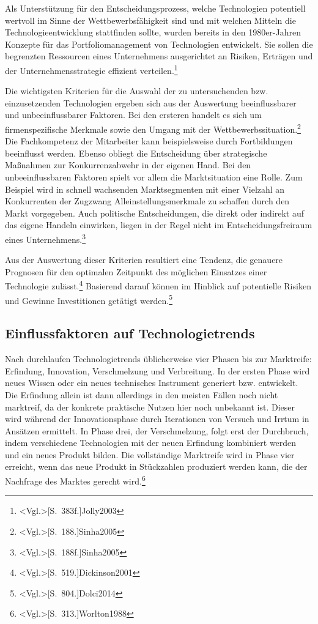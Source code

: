 Als Unterstützung für den Entscheidungsprozess, welche Technologien potentiell wertvoll im Sinne der Wettbewerbsfähigkeit sind und mit welchen Mitteln die Technologieentwicklung stattfinden sollte, wurden bereits in den 1980er-Jahren Konzepte für das Portfoliomanagement von Technologien entwickelt. Sie sollen die begrenzten Ressourcen eines Unternehmens ausgerichtet an Risiken, Erträgen und der Unternehmensstrategie effizient verteilen.\footnote{\citeNP<Vgl.>[S.~383f.]{Jolly2003}}

Die wichtigsten Kriterien für die Auswahl der zu untersuchenden bzw. einzusetzenden Technologien ergeben sich aus der Auswertung beeinflussbarer und unbeeinflussbarer Faktoren. Bei den ersteren handelt es sich um firmenspezifische Merkmale sowie den Umgang mit der Wettbewerbssituation.\footnote{\citeNP<Vgl.>[S.~188.]{Sinha2005}} Die Fachkompetenz der Mitarbeiter kann beispielsweise durch Fortbildungen beeinflusst werden. Ebenso obliegt die Entscheidung über strategische Maßnahmen zur Konkurrenzabwehr in der eigenen Hand. Bei den unbeeinflussbaren Faktoren spielt vor allem die Marktsituation eine Rolle. Zum Beispiel wird in schnell wachsenden Marktsegmenten mit einer Vielzahl an Konkurrenten der Zugzwang Alleinstellungsmerkmale zu schaffen durch den Markt vorgegeben. Auch politische Entscheidungen, die direkt oder indirekt auf das eigene Handeln einwirken, liegen in der Regel nicht im Entscheidungsfreiraum eines Unternehmens.\footnote{\citeNP<Vgl.>[S.~188f.]{Sinha2005}}

Aus der Auswertung dieser Kriterien resultiert eine Tendenz, die genauere Prognosen für den optimalen Zeitpunkt des möglichen Einsatzes einer Technologie zulässt.\footnote{\citeNP<Vgl.>[S.~519.]{Dickinson2001}} Basierend darauf können im Hinblick auf potentielle Risiken und Gewinne Investitionen getätigt werden.\footnote{\citeNP<Vgl.>[S.~804.]{Dolci2014}}

\subsection{Einflussfaktoren auf Technologietrends}
Nach  durchlaufen Technologietrends üblicherweise vier Phasen bis zur Marktreife: Erfindung, Innovation, Verschmelzung und Verbreitung. In der ersten Phase wird neues Wissen oder ein neues technisches Instrument generiert bzw. entwickelt. Die Erfindung allein ist dann allerdings in den meisten Fällen noch nicht marktreif, da der konkrete praktische Nutzen hier noch unbekannt ist. Dieser wird während der Innovationsphase durch Iterationen von Versuch und Irrtum in Ansätzen ermittelt. In Phase drei, der Verschmelzung, folgt erst der Durchbruch, indem verschiedene Technologien mit der neuen Erfindung kombiniert werden und ein neues Produkt bilden. Die vollständige Marktreife wird in Phase vier erreicht, wenn das neue Produkt in Stückzahlen produziert werden kann, die der Nachfrage des Marktes gerecht wird.\footnote{\citeNP<Vgl.>[S.~313.]{Worlton1988}}

